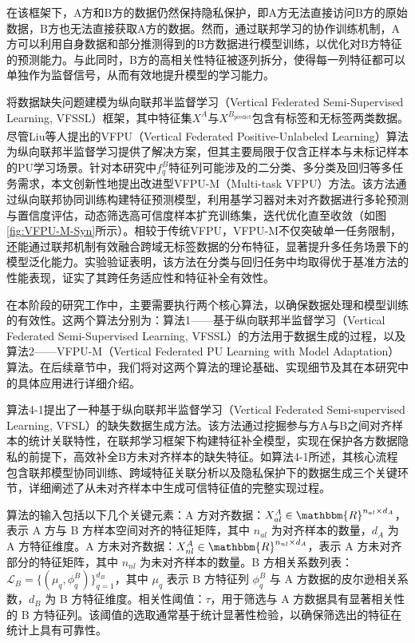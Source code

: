 在该框架下，A方和B方的数据仍然保持隐私保护，即A方无法直接访问B方的原始数据，B方也无法直接获取A方的数据。然而，通过联邦学习的协作训练机制，A方可以利用自身数据和部分推测得到的B方数据进行模型训练，以优化对B方特征的预测能力。与此同时，B方的高相关性特征被逐列拆分，使得每一列特征都可以单独作为监督信号，从而有效地提升模型的学习能力。

将数据缺失问题建模为纵向联邦半监督学习（Vertical Federated Semi-Supervised Learning, VFSSL）框架，其中特征集$X^A$与$X^{B_{\text{predict}}}$包含有标签和无标签两类数据。尽管Liu等人\textsuperscript{\cite{liu2023multi}}提出的VFPU（Vertical Federated Positive-Unlabeled Learning）算法为纵向联邦半监督学习提供了解决方案，但其主要局限于仅含正样本与未标记样本的PU学习场景。针对本研究中$f_q^B$特征列可能涉及的二分类、多分类及回归等多任务需求，本文创新性地提出改进型VFPU-M（Multi-task VFPU）方法。该方法通过纵向联邦协同训练构建特征预测模型，利用基学习器对未对齐数据进行多轮预测与置信度评估，动态筛选高可信度样本扩充训练集，迭代优化直至收敛（如图\ref{fig:VFPU-M-Syn}所示）。相较于传统VFPU，VFPU-M不仅突破单一任务限制，还能通过联邦机制有效融合跨域无标签数据的分布特征，显著提升多任务场景下的模型泛化能力。实验验证表明，该方法在分类与回归任务中均取得优于基准方法的性能表现，证实了其跨任务适应性和特征补全有效性。

在本阶段的研究工作中，主要需要执行两个核心算法，以确保数据处理和模型训练的有效性。这两个算法分别为：算法1——基于纵向联邦半监督学习（Vertical Federated Semi-Supervised Learning, VFSSL）的方法用于数据生成的过程，以及算法2——VFPU-M（Vertical Federated PU Learning with Model Adaptation）算法。在后续章节中，我们将对这两个算法的理论基础、实现细节及其在本研究中的具体应用进行详细介绍。

算法4-1提出了一种基于纵向联邦半监督学习（Vertical Federated Semi-supervised Learning, VFSL）的缺失数据生成方法。该方法通过挖掘参与方A与B之间对齐样本的统计关联特性，在联邦学习框架下构建特征补全模型，实现在保护各方数据隐私的前提下，高效补全B方未对齐样本的缺失特征。如算法4-1所述，其核心流程包含联邦模型协同训练、跨域特征关联分析以及隐私保护下的数据生成三个关键环节，详细阐述了从未对齐样本中生成可信特征值的完整实现过程。

算法的输入包括以下几个关键元素：A 方对齐数据：$X_{al}^A \in \mathbbm{R}^{n_{al} \times d_A}$，表示 A 方与 B 方样本空间对齐的特征矩阵，其中 $n_{al}$ 为对齐样本的数量，$d_A$ 为 A 方特征维度。A 方未对齐数据：$X_{nl}^A \in \mathbbm{R}^{n_{nl} \times d_A}$，表示 A 方未对齐部分的特征矩阵，其中 $n_{nl}$ 为未对齐样本的数量。B 方相关系数列表：$\mathcal{L}_B = \{(\mu_q, \phi^B_q)\}_{q=1}^{d_B}$，其中 $\mu_q$ 表示 B 方特征列 $\phi^B_q$ 与 A 方数据的皮尔逊相关系数，$d_B$ 为 B 方特征维度。相关性阈值：$\tau$，用于筛选与 A 方数据具有显著相关性的 B 方特征列。该阈值的选取通常基于统计显著性检验，以确保筛选出的特征在统计上具有可靠性。

